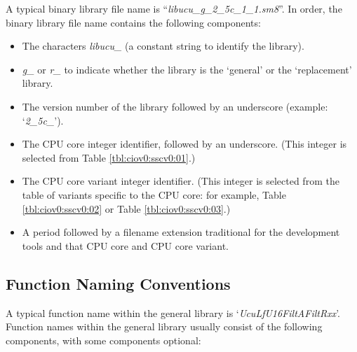 %
A typical binary library file name is ``\emph{libucu\_g\_2\_5c\_1\_1.sm8}''.
In order, the binary library file name contains the following components:

\begin{itemize}
\item The characters \emph{libucu\_} (a constant string
      to identify the library).
\item \emph{g\_} or \emph{r\_} to indicate whether the library
      is the `general' or the `replacement' library.
\item The version number of the library followed by an underscore
      (example: `\emph{2\_5c\_}').
\item The CPU core integer identifier, followed by an underscore.  (This integer
      is selected from Table \ref{tbl:ciov0:sscv0:01}.)
\item The CPU core variant integer identifier.  (This integer is selected from the table 
      of variants specific to the CPU core:  for example, Table \ref{tbl:ciov0:sscv0:02} or
      Table \ref{tbl:ciov0:sscv0:03}.)
\item A period followed by a filename extension traditional for the
      development tools and that CPU core and CPU core variant.
\end{itemize}


\subsection{Function Naming Conventions}
\label{ciov0:slcv0:sfnc0}

A typical function name within the general library is
`\emph{UcuLfU16FiltAFiltRxx}'.  Function names within the general library
usually consist of the following components, with some components optional:


